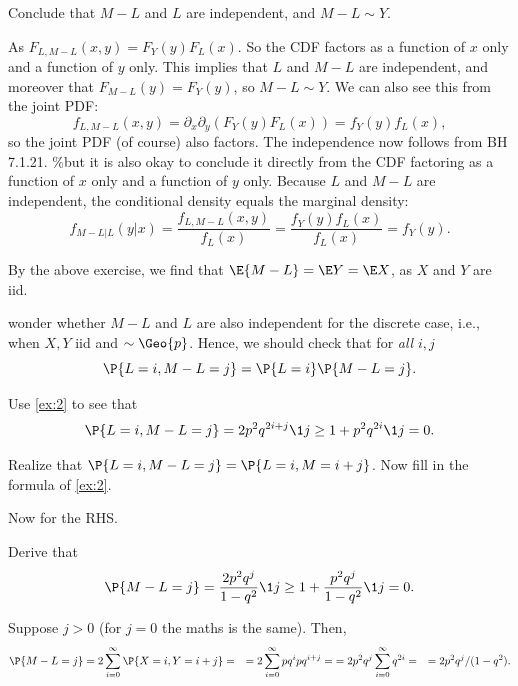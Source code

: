 \documentclass[a4paper]{article}
\begin{document}
\begin{exercise}
Conclude that \(M-L\) and \(L\) are independent, and \(M-L\sim Y\).
\begin{solution}
As  \(F_{L,M-L}(x,y) = F_Y(y) F_L(x)\). So the CDF factors as a function of \(x\) only and a function of \(y\) only. This implies that \(L\) and \(M-L\) are independent, and moreover that \(F_{M-L}(y) =  F_Y(y)\), so \(M-L \sim Y\). We can also see this from the joint PDF:
\begin{equation*}
f_{L, M-L}(x,y) = \partial_x \partial_y (F_Y(y) F_L(x)) = f_Y(y) f_L(x),
\end{equation*}
so the joint PDF (of course) also factors. The independence now follows from BH 7.1.21.
\%but it is also okay to conclude it directly from the CDF factoring as a function of \(x\) only and a function of \(y\) only.
Because \(L\) and \(M-L\) are independent, the conditional density equals the marginal density:
\begin{equation*}
f_{M-L|L}(y|x) = \frac{f_{L, M-L}(x, y)}{f_L(x)} = \frac{f_Y(y) f_L(x)}{f_L(x)} = f_Y(y).
\end{equation*}
\end{solution}
\end{exercise}

By the  above exercise, we find that \(\E{M-L} = \E Y = \E X\), as \(X\) and \(Y\) are iid.


 wonder whether \(M-L\) and \(L\) are also independent for the discrete case, i.e.,  when  \(X, Y\) iid and \(\sim \Geo{p}\).
Hence, we should check that for  \emph{all} \(i, j\)
\begin{equation}
\label{eq:34}
\P{L=i, M-L=j} = \P{L=i} \P{M-L=j}.
\end{equation}


\begin{exercise}
Use \cref{ex:2} to see that
\begin{equation*}
\P{L=i, M-L=j} = 2p^2q^{2i+j} \1{j\geq 1} + p^2q^{2i}\1{j=0}.
\end{equation*}
\begin{hint}
Realize that \(\P{L=i, M-L=j}=  \P{L=i, M=i+j}\). Now fill in the formula of \cref{ex:2}.
\end{hint}
\end{exercise}

Now for the RHS.
\begin{exercise}
Derive that
\begin{equation*}
\P{M-L=j} = \frac{2p^2q^{j}}{1-q^2}\1{j\geq 1} + \frac{p^2q^{j}}{1-q^2}\1{j=0}.
\end{equation*}
\begin{solution}
Suppose \(j>0\) (for \(j=0\) the maths is the same). Then,
\begin{align*}
  \P{M-L=j}
&=2\sum_{i=0}^{\infty}\P{X =i, Y=i+j } =
&=2\sum_{i=0}^{\infty}p q^i pq^{i+j} =
&=2p^{2}q^{j}\sum_{i=0}^{\infty}q^{2i} =
&=2p^{2}q^{j}/(1-q^2).
\end{align*}
\end{solution}
\end{exercise}
\end{document}
